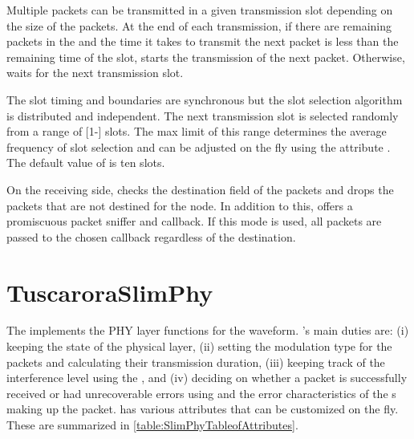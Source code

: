 Multiple packets can be transmitted in a given transmission slot depending on the size of the packets. 
At the end of each transmission, 
if there are remaining packets in the  and
the time it takes to transmit the next packet is less than the remaining time of the slot,  starts the transmission of the next packet. 
Otherwise,  waits for the next transmission slot. 

The slot timing and boundaries are synchronous but the slot selection algorithm is distributed and independent. The next transmission slot is selected randomly from a range of [1-] slots. The max limit of this range determines the average frequency of slot selection and can be adjusted on the fly using the attribute . The default value of  is ten slots. 

On the receiving side,  checks the destination field of the packets and drops the packets that are not destined for the node. In addition to this,  offers a promiscuous packet sniffer and callback. If this mode is used, all packets are passed to the chosen callback regardless of the destination.  

\section{TuscaroraSlimPhy}

The  implements the PHY layer functions for the  waveform. 's main duties are: 
(i) keeping the state of the physical layer, 
(ii) setting the modulation type for the packets and calculating their transmission duration, 
(iii) keeping track of the interference level using the , and 
(iv) deciding on whether a packet is successfully received or had unrecoverable errors using  and the error characteristics of the s making up the packet.
 has various attributes that can be customized on the fly. These are summarized in \cref{table:SlimPhyTableofAttributes}.





